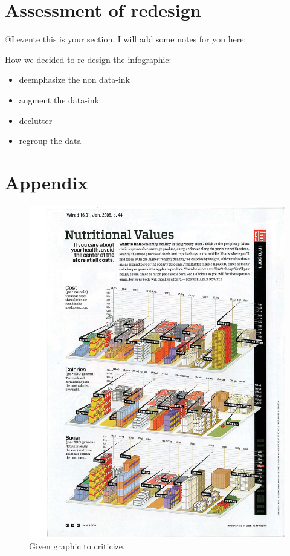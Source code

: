 \documentclass[a4paper]{scrartcl}
\begin{document}


\section{Assessment of redesign}

@Levente this is your section, I will add some notes for you here:

How we decided to re design the infographic:

\begin{itemize}
	\item deemphasize the non data-ink
	\item augment the data-ink
	\item declutter
	\item regroup the data
\end{itemize}





\newpage
\clearpage
\section{Appendix}

\begin{figure}[h]
  \centering
	\includegraphics[scale=0.20]{assignmentGraphic.jpg}
  \caption{Given graphic to criticize.}
	\label{assignmentGraphic}
\end{figure}
\end{document}
